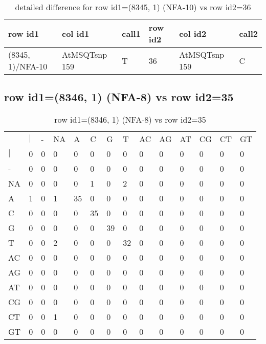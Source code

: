 \begin{center}
\begin{longtable}{|l|l|l|l|l|l|}
\caption{detailed difference for row id1=(8345, 1) (NFA-10) vs row id2=36} \label{table_dm553}\\
\hline
row id1&col id1&call1&row id2&col id2&call2\\
\hline
(8345, 1)/NFA-10&AtMSQTsnp 159&T&36&AtMSQTsnp 159&C\\
\hline
\end{longtable}
\end{center}

\subsection{row id1=(8346, 1) (NFA-8) vs row id2=35}
\begin{center}
\begin{longtable}{|l|l|l|l|l|l|l|l|l|l|l|l|l|l|}
\caption{row id1=(8346, 1) (NFA-8) vs row id2=35} \label{table_dm554}\\
\hline
\\
\hline
&$|$&-&NA&A&C&G&T&AC&AG&AT&CG&CT&GT\\
$|$&0&0&0&0&0&0&0&0&0&0&0&0&0\\
-&0&0&0&0&0&0&0&0&0&0&0&0&0\\
NA&0&0&0&0&1&0&2&0&0&0&0&0&0\\
A&1&0&1&35&0&0&0&0&0&0&0&0&0\\
C&0&0&0&0&35&0&0&0&0&0&0&0&0\\
G&0&0&0&0&0&39&0&0&0&0&0&0&0\\
T&0&0&2&0&0&0&32&0&0&0&0&0&0\\
AC&0&0&0&0&0&0&0&0&0&0&0&0&0\\
AG&0&0&0&0&0&0&0&0&0&0&0&0&0\\
AT&0&0&0&0&0&0&0&0&0&0&0&0&0\\
CG&0&0&0&0&0&0&0&0&0&0&0&0&0\\
CT&0&0&1&0&0&0&0&0&0&0&0&0&0\\
GT&0&0&0&0&0&0&0&0&0&0&0&0&0\\
\hline
\end{longtable}
\end{center}

